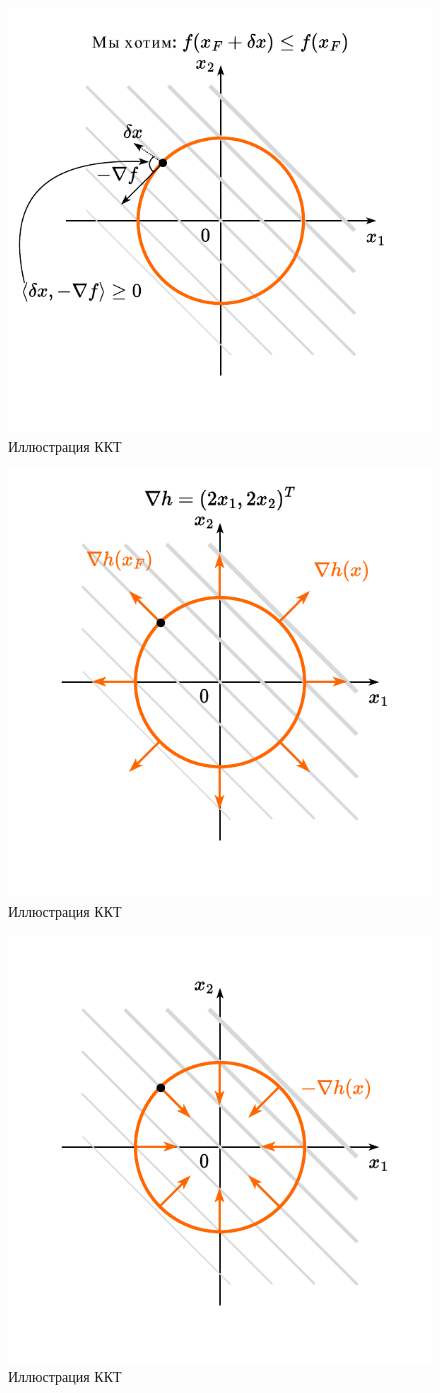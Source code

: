 \documentclass[
  russian,
  letterpaper,
  DIV=11,
  numbers=noendperiod]{scrartcl}
\begin{document}
\begin{figure}[H]

{\centering \includegraphics[width=0.5\linewidth,height=\textheight,keepaspectratio]{graphon-eq_constraint_6_ru.pdf}

}

\caption{Иллюстрация ККТ}

\end{figure}%

\begin{figure}[H]

{\centering \includegraphics[width=0.5\linewidth,height=\textheight,keepaspectratio]{eq_constr_7.pdf}

}

\caption{Иллюстрация ККТ}

\end{figure}%

\begin{figure}[H]

{\centering \includegraphics[width=0.5\linewidth,height=\textheight,keepaspectratio]{eq_constr_8.pdf}

}

\caption{Иллюстрация ККТ}

\end{figure}%
\end{document}
